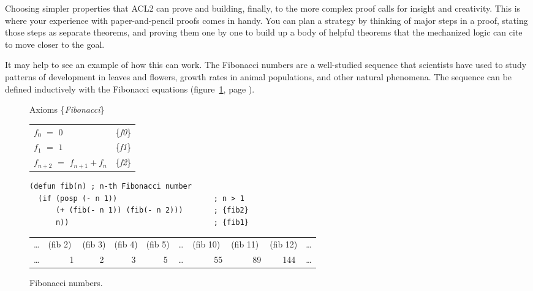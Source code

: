 Choosing simpler properties that ACL2 can prove
and building, finally, to the more complex proof
calls for insight and creativity.
This is where your experience with paper-and-pencil proofs
comes in handy.
You can plan a strategy by thinking of major steps
in a proof, stating those steps as separate theorems,
and proving them one by one to build up a body
of helpful theorems that the mechanized logic
can cite to move closer to the goal.

It may help to see an example of how this can work.
The Fibonacci numbers are a well-studied sequence that
scientists have used to study
patterns of development in leaves and flowers,
growth rates in animal populations,
and other natural phenomena.
The sequence can be defined inductively
with the Fibonacci equations
(figure~\ref{fig:Fibonacci-axioms}, page \pageref{fig:Fibonacci-axioms}).

\begin{figure}
\begin{center}
Axioms \{\emph{Fibonacci}\}
\begin{tabular}{ll}
$f_0$ $=$ $0$                   & \{\emph{f0}\} \\
$f_1$ $=$ $1$                   & \{\emph{f1}\} \\
$f_{n+2}$ $=$ $f_{n+1} + f_{n}$ & \{\emph{f2}\} \\
\end{tabular}
\begin{code}
\begin{verbatim}
(defun fib(n) ; n-th Fibonacci number
  (if (posp (- n 1))                      ; n > 1
      (+ (fib(- n 1)) (fib(- n 2)))       ; {fib2}
      n))                                 ; {fib1}
\end{verbatim}
\end{code}

\begin{tabular}{llllllllll}
\dots & \textsf{(fib 2)} & \textsf{(fib 3)} & \textsf{(fib 4)} & \textsf{(fib 5)} & \dots & \textsf{(fib 10)} & \textsf{(fib 11)} & \textsf{(fib 12)} & \dots \\
\dots & ~~~~~1  &  ~~~~2  &  ~~~~3  &  ~~~~5  & \dots &  ~~~~~55 &  ~~~~~89 & ~~~144   & \dots \\
\end{tabular}
\end{center}
\caption{Fibonacci numbers.}
\label{fig:Fibonacci-axioms}
\end{figure}

